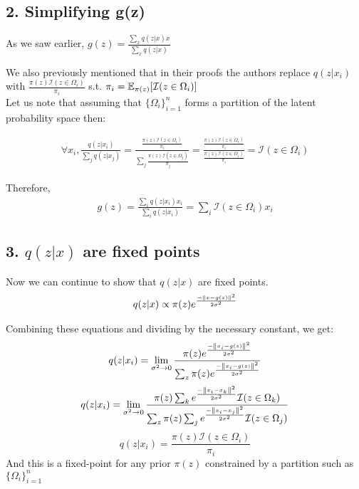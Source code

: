 \subsection*{2. Simplifying g(z)}
As we saw earlier, $g(z)=\frac{\sum_{x}{q(z|x) x}}{\sum_{x}{q(z|x)}}$

We also previously mentioned that in their proofs the authors replace $q(z|x_{i})$ with $\frac{\pi(z)\mathcal{I}({z\in\Omega_{i}})}{\pi_{i}}$ s.t. $\pi_{i} = \operatorname{\mathbb{E}}_{\pi(z)}[\mathcal{I}(z\in\Omega_{i})]$\\
Let us note that assuming that $\lbrace{{\Omega_i}\rbrace}_{i=1}^n$ forms a partition of the latent probability space then:

\begin{gather*}
\forall x_i, \frac{q(z|x_i)}{\sum_j q(z|x_j)} = \frac{\frac{\pi(z)\mathcal{I}({z\in\Omega_{i}})}{\pi_{i}}}{\sum_j \frac{\pi(z)\mathcal{I}({z\in\Omega_{j}})}{\pi_{j}}} = \frac{\frac{\pi(z)\mathcal{I}({z\in\Omega_{i}})}{\pi_{i}}}{\frac{\pi(z)\mathcal{I}({z\in\Omega_{i}})}{\pi_{i}}} = \mathcal{I}(z\in\Omega_i)
\end{gather*}

Therefore,
\begin{gather*}
g(z)=\frac{\sum_{i}{q(z|x_i) x_i}}{\sum_{i}{q(z|x_i)}} = \sum_i \mathcal{I}(z\in\Omega_i)x_i
\end{gather*}

\subsection*{3. $q(z|x)$ are fixed points}
Now we can continue to show that $q(z|x)$ are fixed points.\\

\begin{gather*}
q(z|x) \propto \pi(z)e^\frac{-\left\lVert x-g(z)\right\rVert^2}{2\sigma^2}
\end{gather*}

Combining these equations and dividing by the necessary constant, we get:
\setcounter{equation}{0}
\begin{equation}
q(z|x_i) = \lim_{\sigma^2\to0}\frac{\pi(z)e^\frac{-\left\lVert x_i-g(z)\right\rVert^2}{2\sigma^2}}{\sum_z\pi(z)e^\frac{-\left\lVert x_i-g(z)\right\rVert^2}{2\sigma^2}}
\end{equation}
\begin{equation}
q(z|x_i) = \lim_{\sigma^2\to0}\frac{\pi(z)\sum_k e^\frac{-\left\lVert x_i- x_k\right\rVert^2}{2\sigma^2}\mathcal{I}(z\in\Omega_k)}{\sum_z\pi(z)\sum_j e^\frac{-\left\lVert x_i- x_j\right\rVert^2}{2\sigma^2}\mathcal{I}(z\in\Omega_j)}
\end{equation}
\begin{equation}
q(z|x_i) = \frac{\pi(z)\mathcal{I}(z\in\Omega_i)}{\pi_i}
\end{equation}
And this is a fixed-point for any prior $\pi(z)$ constrained by a partition such as $\lbrace{{\Omega_i}\rbrace}_{i=1}^n$

